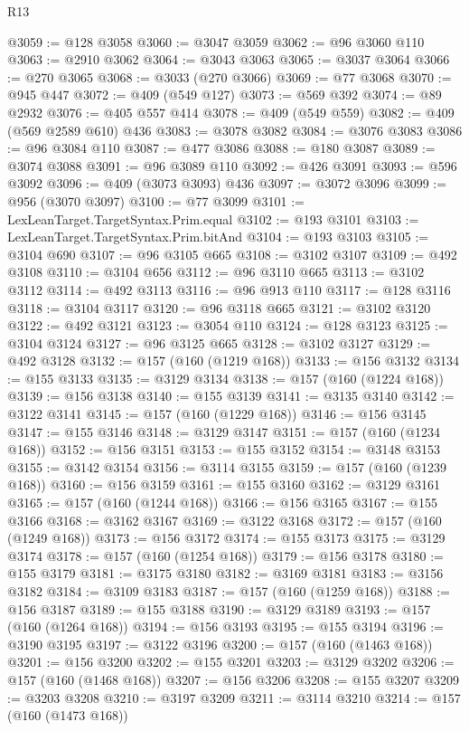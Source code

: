\begin{lexlean}{R13}
\begin{coremodule}
{{{{{{{{{{{{{{{{{{{{{{{{{{{{{{{{{{{{{{{{{{{{{{{{{{{{{{{{{{{{{{{{{{{{{{{{{{{{{{{{{{{{{{{{{{{{{{{{{{{{{{{{{{@3059 := @128 @3058
@3060 := @3047 @3059
@3062 := @96 @3060 @110
@3063 := @2910 @3062
@3064 := @3043 @3063
@3065 := @3037 @3064
@3066 := @270 @3065
@3068 := @3033 (@270 @3066)
@3069 := @77 @3068
@3070 := @945 @447
@3072 := @409 (@549 @127)
@3073 := @569 @392
@3074 := @89 @2932
@3076 := @405 @557 @414
@3078 := @409 (@549 @559)
@3082 := @409 (@569 @2589 @610) @436
@3083 := @3078 @3082
@3084 := @3076 @3083
@3086 := @96 @3084 @110
@3087 := @477 @3086
@3088 := @180 @3087
@3089 := @3074 @3088
@3091 := @96 @3089 @110
@3092 := @426 @3091
@3093 := @596 @3092
@3096 := @409 (@3073 @3093) @436
@3097 := @3072 @3096
@3099 := @956 (@3070 @3097)
@3100 := @77 @3099
@3101 := LexLeanTarget.TargetSyntax.Prim.equal
@3102 := @193 @3101
@3103 := LexLeanTarget.TargetSyntax.Prim.bitAnd
@3104 := @193 @3103
@3105 := @3104 @690
@3107 := @96 @3105 @665
@3108 := @3102 @3107
@3109 := @492 @3108
@3110 := @3104 @656
@3112 := @96 @3110 @665
@3113 := @3102 @3112
@3114 := @492 @3113
@3116 := @96 @913 @110
@3117 := @128 @3116
@3118 := @3104 @3117
@3120 := @96 @3118 @665
@3121 := @3102 @3120
@3122 := @492 @3121
@3123 := @3054 @110
@3124 := @128 @3123
@3125 := @3104 @3124
@3127 := @96 @3125 @665
@3128 := @3102 @3127
@3129 := @492 @3128
@3132 := @157 (@160 (@1219 @168))
@3133 := @156 @3132
@3134 := @155 @3133
@3135 := @3129 @3134
@3138 := @157 (@160 (@1224 @168))
@3139 := @156 @3138
@3140 := @155 @3139
@3141 := @3135 @3140
@3142 := @3122 @3141
@3145 := @157 (@160 (@1229 @168))
@3146 := @156 @3145
@3147 := @155 @3146
@3148 := @3129 @3147
@3151 := @157 (@160 (@1234 @168))
@3152 := @156 @3151
@3153 := @155 @3152
@3154 := @3148 @3153
@3155 := @3142 @3154
@3156 := @3114 @3155
@3159 := @157 (@160 (@1239 @168))
@3160 := @156 @3159
@3161 := @155 @3160
@3162 := @3129 @3161
@3165 := @157 (@160 (@1244 @168))
@3166 := @156 @3165
@3167 := @155 @3166
@3168 := @3162 @3167
@3169 := @3122 @3168
@3172 := @157 (@160 (@1249 @168))
@3173 := @156 @3172
@3174 := @155 @3173
@3175 := @3129 @3174
@3178 := @157 (@160 (@1254 @168))
@3179 := @156 @3178
@3180 := @155 @3179
@3181 := @3175 @3180
@3182 := @3169 @3181
@3183 := @3156 @3182
@3184 := @3109 @3183
@3187 := @157 (@160 (@1259 @168))
@3188 := @156 @3187
@3189 := @155 @3188
@3190 := @3129 @3189
@3193 := @157 (@160 (@1264 @168))
@3194 := @156 @3193
@3195 := @155 @3194
@3196 := @3190 @3195
@3197 := @3122 @3196
@3200 := @157 (@160 (@1463 @168))
@3201 := @156 @3200
@3202 := @155 @3201
@3203 := @3129 @3202
@3206 := @157 (@160 (@1468 @168))
@3207 := @156 @3206
@3208 := @155 @3207
@3209 := @3203 @3208
@3210 := @3197 @3209
@3211 := @3114 @3210
@3214 := @157 (@160 (@1473 @168))
}}}}}}}}}}}}}}}}}}}}}}}}}}}}}}}}}}}}}}}}}}}}}}}}}}}}}}}}}}}}}}}}}}}}}}}}}}}}}}}}}}}}}}}}}}}}}}}}}}}}}}}}}}
\end{coremodule}
\end{lexlean}
